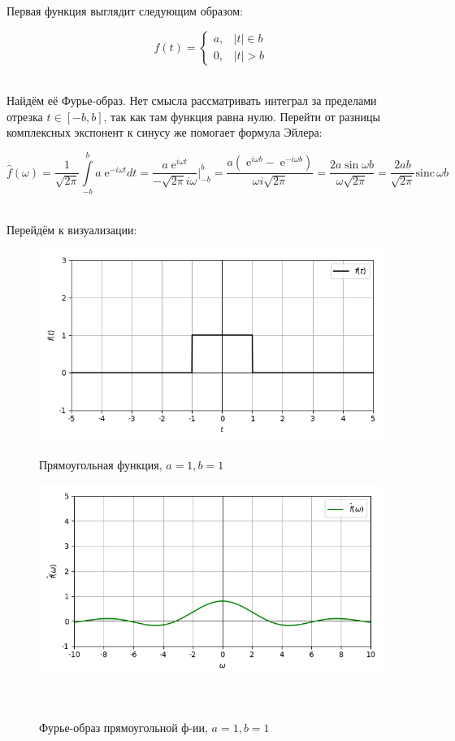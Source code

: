 \documentclass[a4paper]{article}
\newcommand{\at}{\biggr\rvert}
\newcommand{\e}{\;\text{e}}
\let\oldint\int
\def\int{\oldint\limits}
\begin{document}
Первая функция выглядит следующим образом:

$$
f(t) = \begin{cases}
    a, & \left| t \right| \in b \\
    0, & \left| t \right| > b
\end{cases}
$$\

Найдём её Фурье-образ. Нет смысла рассматривать интеграл за пределами отрезка $t \in [-b, b]$, так как там функция равна нулю. Перейти от разницы комплексных экспонент к синусу же помогает формула Эйлера:

$$
\hat{f}(\omega)=\frac{1}{\sqrt{2\pi}}\int_{-b}^{b}a\e^{-i\omega t}dt = \frac{a\e^{i\omega t}}{-\sqrt{2\pi}i\omega}\at^b_{-b} = \frac{a\left( \e^{i\omega b} - \e^{-i\omega b} \right)}{\omega i\sqrt{2\pi}} = \frac{2a\sin{\omega b}}{\omega\sqrt{2\pi}} = \frac{2ab}{\sqrt{2\pi}}\mathrm{sinc}\,\omega b
$$\

Перейдём к визуализации:

\begin{figure}[H]
    \begin{minipage}{0.5\textwidth}
        \centering \includegraphics[width=\textwidth]{rectangular/real_graph_1_1.png}
        \caption{Прямоугольная функция, $a = 1, b = 1$}
    \end{minipage}\hfill
    \begin{minipage}{0.5\textwidth}
        \centering \includegraphics[width=\textwidth]{rectangular/real_fourier_1_1.png}
        \caption{Фурье-образ прямоугольной ф-ии, $a = 1, b = 1$}
    \end{minipage}\\[1em]
\end{figure}\noindent\
\end{document}
